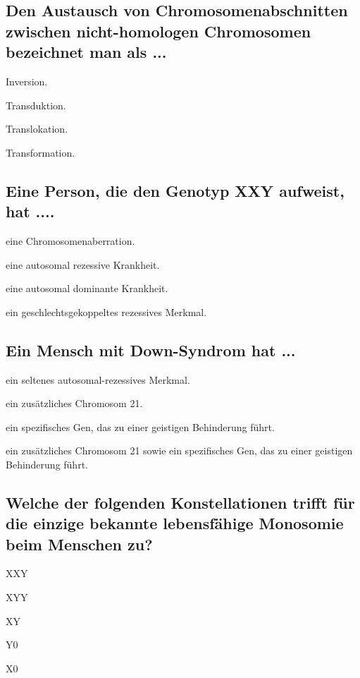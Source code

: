 \documentclass{article}
\begin{document}
\subsection*{Den Austausch von Chromosomenabschnitten zwischen nicht-homologen
Chromosomen bezeichnet man als ...}
\begin{todolist}%
\item Inversion.  
\item Transduktion.  
\item Translokation. 
\item Transformation.  
\end{todolist}

\subsection*{Eine Person, die den Genotyp XXY aufweist, hat ....}
\begin{todolist}%
\item eine Chromosomenaberration.  
\item eine autosomal rezessive Krankheit.   
\item eine autosomal dominante Krankheit.  
\item ein geschlechtsgekoppeltes rezessives Merkmal.  
\end{todolist} 

\subsection*{Ein Mensch mit Down-Syndrom hat ...}
\begin{todolist}%
\item ein seltenes autosomal-rezessives Merkmal.  
\item ein zusätzliches Chromosom 21.
\item ein spezifisches Gen, das zu einer geistigen Behinderung führt.  
\item ein zusätzliches Chromosom 21 sowie ein spezifisches Gen,
das zu einer geistigen Behinderung führt.  
\end{todolist}

\subsection*{Welche der folgenden Konstellationen trifft für die einzige bekannte lebensfähige Monosomie beim Menschen zu?}
\begin{todolist}%
\item XXY  
\item XYY  
\item XY  
\item Y0  
\item X0     
\end{todolist}
\end{document}
